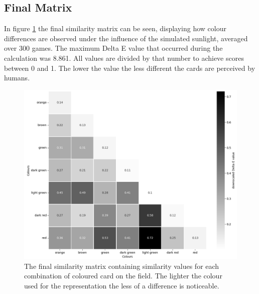 \subsection{Final Matrix}
\label{final_matrix}
In figure \ref{fig:simMatrix} the final similarity matrix can be seen, displaying how colour differences are observed under the influence of the simulated sunlight, averaged over 300 games. The maximum Delta E value that occurred during the calculation was 8.861. All values are divided by that number to achieve scores between 0 and 1. The lower the value the less different the cards are perceived by humans.
\begin{figure}[H]
	\centering
	\includegraphics[width=15cm]{images/simMatrixGrey_new.png}
	\caption[Final similarity matrix for the glare effect.]{The final similarity matrix containing similarity values for each combination of coloured card on the field. The lighter the colour used for the representation the less of a difference is noticeable.}
	\label{fig:simMatrix}
\end{figure}

